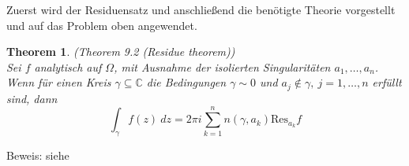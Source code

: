 \documentclass[a4paper,12pt]{report}
\newcommand{\C}{\mathbb C}
\newcommand{\1}{\mathds{1}}
\newcommand{\Res}{\text{Res}}
\theoremstyle{plain} %
\newtheorem{theorem}{Theorem}
\theoremstyle{definition} %
\theoremstyle{remark}
\begin{document}
            Zuerst wird der Residuensatz und anschließend die benötigte Theorie vorgestellt und auf das Problem oben angewendet.

            \begin{theorem}(Theorem 9.2 (Residue theorem)\cite[S. 141]{complexAnalysis})\\
                  \label{thrm: Residuensatz}
                  Sei $f$ analytisch auf $\Omega$, mit Ausnahme der isolierten Singularitäten $a_1,\dots,a_n$. Wenn für einen Kreis $\gamma\subseteq\C$ die Bedingungen $\gamma \sim 0$ und $a_j\notin \gamma,\ j=1,\dots,n$ erfüllt sind, dann
                  $$\int_\gamma f(z)\ dz = 2\pi i\sum_{k=1}^{n} n(\gamma, a_k)\Res_{a_k}f$$
            \end{theorem}
            Beweis: siehe \cite[S. 142]{complexAnalysis}
\end{document}
